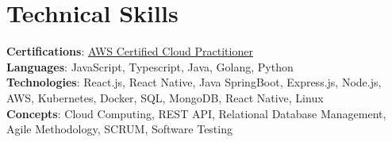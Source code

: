 \section{Technical Skills}
    \begin{itemize}[leftmargin=0.15in, label={}]
	\small{\item{
		\textbf{Certifications}{: \href{https://www.credly.com/badges/b6b11eb9-15a3-4bf0-8542-85e1f57f57ce/linked_in_profile}{AWS Certified Cloud Practitioner}} \\
		\textbf{Languages}{: JavaScript, Typescript, Java, Golang, Python } \\
		\textbf{Technologies}{: React.js, React Native, Java SpringBoot, Express.js, Node.js, AWS, Kubernetes, Docker, SQL, MongoDB, React Native, Linux } \\
		\textbf{Concepts}{: Cloud Computing, REST API, Relational Database Management, Agile Methodology, SCRUM,  Software Testing }
	}}
    \end{itemize}